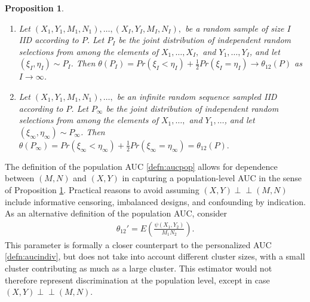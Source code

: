 \documentclass[12pt]{article}
\DeclareMathOperator{\AUC}{AUC}
\newcommand{\I}{I}
\newcommand{\E}{E}
\renewcommand{\P}{P}
\newcommand{\cind}{\perp \!\!\! \perp}
\newcommand{\aucpop}{\theta_{12}}%
\newcommand{\Kernel}{\psi}
\newcommand{\seqspace}{V}%
\newtheorem{proposition}[theorem]{Proposition}
\newtheorem{lemma}[theorem]{Lemma}
\newcommand{\comment}[1]{
  \iftoggle{commenttoggle}{
    {\normalsize{\color{red}{ #1}}\normalsize}
  }
  {}
}
\begin{document}
\begin{proposition}
  \label{proposition:aucpop}
  \begin{enumerate}
  \item Let $(X_1,Y_1,M_1,N_1),\ldots,(X_\I,Y_\I,M_\I,N_\I),$
    be a random sample of size $\I$ IID according to $\P$. Let $\P_\I$ be
    the joint distribution of independent random selections from
    among the elements of $X_1,\ldots,X_\I,$ and $Y_1,\ldots,Y_\I$, and
    let $(\xi_\I,\eta_\I)\sim\P_\I$. Then
    $\theta(\P_\I)=Pr(\xi_\I<\eta_\I)+\frac{1}{2}Pr(\xi_I=\eta_I) \to \theta_{12}(\P)$
    as $\I\to\infty$.
  \item Let $(X_1,Y_1,M_1,N_1),\ldots,$
    be an infinite random sequence sampled IID according to $\P$. Let $\P_\infty$ be
    the joint distribution of independent random selections from
    among the elements of $X_1,\ldots,$ and $Y_1,\ldots$, and
    let $(\xi_\infty,\eta_\infty)\sim\P_\infty$. Then
    $\theta(\P_\infty)=Pr(\xi_\infty<\eta_\infty)+\frac{1}{2}Pr(\xi_\infty=\eta_\infty)=\theta_{12}(\P).$
  \end{enumerate}
\end{proposition}


  The definition of the population AUC \eqref{defn:aucpop} allows for
  dependence between $(M,N)$ and $(X,Y)$ in capturing a
  population-level AUC in the sense of Proposition
  \ref{proposition:aucpop}. Practical reasons to avoid assuming
  $(X,Y)\cind (M,N)$ %
  include informative censoring, imbalanced designs, and confounding by indication. As an alternative definition of the population AUC,
  consider
  \begin{align}
  \aucpop'=\E\left(\frac{\psi(X_1,Y_2)}{M_1N_2} \right).\label{defn:aucalternative}
  \end{align}
  This parameter is formally a closer counterpart to the personalized
  AUC \eqref{defn:aucindiv}, but does not take into account different
  cluster sizes, with a small cluster contributing as much as a large
  cluster.  This
  estimator would not therefore represent discrimination at the population level,
  except in case $(X,Y)\cind (M,N)$.
\end{document}

